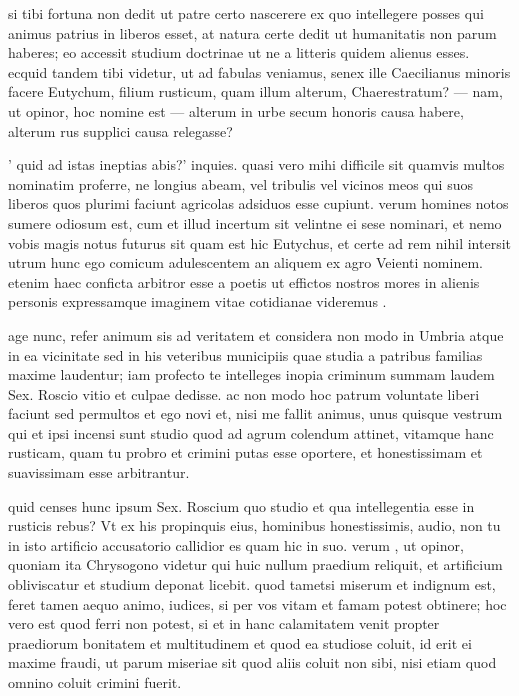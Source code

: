  si tibi fortuna non dedit ut patre certo nascerere ex quo intellegere posses qui animus patrius in liberos esset, at natura certe dedit ut humanitatis non parum haberes; eo accessit studium doctrinae ut ne a litteris quidem alienus esses. ecquid tandem tibi videtur, ut ad fabulas veniamus, senex ille Caecilianus minoris facere Eutychum, filium rusticum, quam illum alterum, Chaerestratum? — nam, ut opinor, hoc nomine est — alterum in urbe secum honoris causa habere, alterum rus supplici causa relegasse?

 ' quid ad istas ineptias abis?' inquies. quasi vero mihi difficile sit quamvis multos nominatim proferre, ne longius abeam, vel tribulis vel vicinos meos qui suos liberos quos plurimi faciunt agricolas adsiduos esse cupiunt. verum homines notos sumere odiosum est, cum et illud incertum sit velintne ei sese nominari, et nemo vobis magis notus futurus sit quam est hic Eutychus, et certe ad rem nihil intersit utrum hunc ego comicum adulescentem an aliquem ex agro Veienti nominem. etenim haec conficta arbitror esse a poetis ut effictos nostros mores in alienis personis expressamque imaginem vitae cotidianae videremus .

 age nunc, refer animum sis ad veritatem et considera non modo in Umbria atque in ea vicinitate sed in his veteribus municipiis quae studia a patribus familias maxime laudentur; iam profecto te intelleges inopia criminum summam laudem Sex. Roscio vitio et culpae dedisse. ac non modo hoc patrum voluntate liberi faciunt sed permultos et ego novi et, nisi me fallit animus, unus quisque vestrum qui et ipsi incensi sunt studio quod ad agrum colendum attinet, vitamque hanc rusticam, quam tu probro et crimini putas esse oportere, et honestissimam et suavissimam esse arbitrantur.

 quid censes hunc ipsum Sex. Roscium quo studio et qua intellegentia esse in rusticis rebus? Vt ex his propinquis eius, hominibus honestissimis, audio, non tu in isto artificio accusatorio callidior es quam hic in suo. verum , ut opinor, quoniam ita Chrysogono videtur qui huic nullum praedium reliquit, et artificium obliviscatur et studium deponat licebit. quod tametsi miserum et indignum est, feret tamen aequo animo, iudices, si per vos vitam et famam potest obtinere; hoc vero est quod ferri non potest, si et in hanc calamitatem venit propter praediorum bonitatem et multitudinem et quod ea studiose coluit, id erit ei maxime fraudi, ut parum miseriae sit quod aliis coluit non sibi, nisi etiam quod omnino coluit crimini fuerit.

